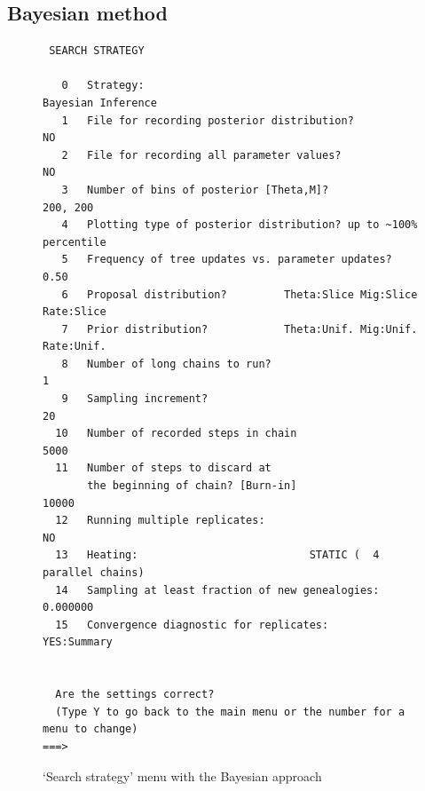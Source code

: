 \subsection{Bayesian method}
\begin{figure}[bht]

\begin{center}

\begin{boxedminipage}{6in}
\begin{small}
\begin{tt}
\begin{verbatim}
 SEARCH STRATEGY

   0   Strategy:                                    Bayesian Inference
   1   File for recording posterior distribution?                   NO
   2   File for recording all parameter values?                     NO
   3   Number of bins of posterior [Theta,M]?                 200, 200
   4   Plotting type of posterior distribution? up to ~100% percentile
   5   Frequency of tree updates vs. parameter updates?           0.50
   6   Proposal distribution?         Theta:Slice Mig:Slice Rate:Slice
   7   Prior distribution?            Theta:Unif. Mig:Unif. Rate:Unif.
   8   Number of long chains to run?                                 1
   9   Sampling increment?                                          20
  10   Number of recorded steps in chain                          5000
  11   Number of steps to discard at 
       the beginning of chain? [Burn-in]                         10000
  12   Running multiple replicates:                                 NO
  13   Heating:                           STATIC (  4 parallel chains)
  14   Sampling at least fraction of new genealogies:         0.000000
  15   Convergence diagnostic for replicates:              YES:Summary


  Are the settings correct?
  (Type Y to go back to the main menu or the number for a menu to change)
===>
\end{verbatim}
\end{tt}
\end{small}
\end{boxedminipage}
\end{center}
\caption{{\sf `Search strategy' menu with the Bayesian approach}}
\label{SEARCHBA}
\end{figure}
